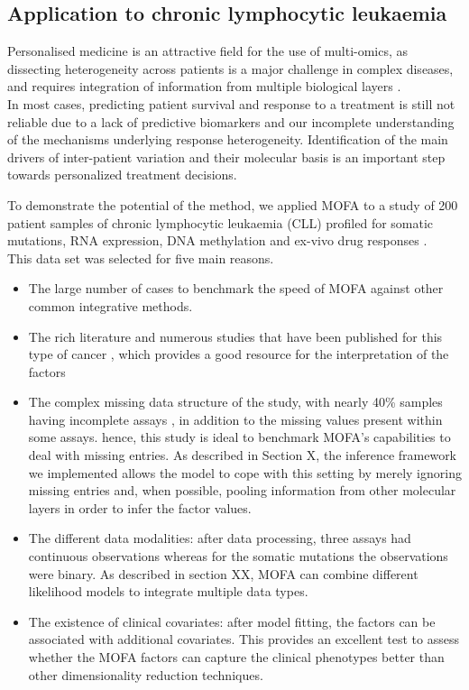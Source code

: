 \subsection{Application to chronic lymphocytic leukaemia} \label{section:mofa_cll}
Personalised medicine is an attractive field for the use of multi-omics, as dissecting heterogeneity across patients is a major challenge in complex diseases, and requires integration of information from multiple biological layers \cite{Chen2013,Costello2014,Alyass2015}.\\
In most cases, predicting patient survival and response to a treatment is still not reliable due to a lack of predictive biomarkers and our incomplete understanding of the mechanisms underlying response heterogeneity. Identification of the main drivers of inter-patient variation and their molecular basis is an important step towards personalized treatment decisions. 

To demonstrate the potential of the method, we applied MOFA to a study of 200 patient samples of chronic lymphocytic leukaemia (CLL) profiled for somatic mutations, RNA expression, DNA methylation and ex-vivo drug responses\cite{Dietrich2018} .\\

This data set was selected for five main reasons. 
\begin{itemize}
	\item The large number of cases to benchmark the speed of MOFA against other common integrative methods.
	\item The rich literature and numerous studies that have been published for this type of cancer \cite{XX}, which provides a good resource for the interpretation of the factors
	\item The complex missing data structure of the study, with nearly 40\% samples having incomplete assays , in addition to the missing values present within some assays. hence, this study is ideal to benchmark MOFA's capabilities to deal with missing entries. As described in Section X, the inference framework we implemented allows the model to cope with this setting by merely ignoring missing entries and, when possible, pooling information from other molecular layers in order to infer the factor values.
	\item The different data modalities: after data processing, three assays had continuous observations whereas for the somatic mutations the observations were binary. As described in section XX, MOFA can combine different likelihood models to integrate multiple data types.
	\item The existence of clinical covariates: after model fitting, the factors can be associated with additional covariates. This provides an excellent test to assess whether the MOFA factors can capture the clinical phenotypes better than other dimensionality reduction techniques.
\end{itemize}


